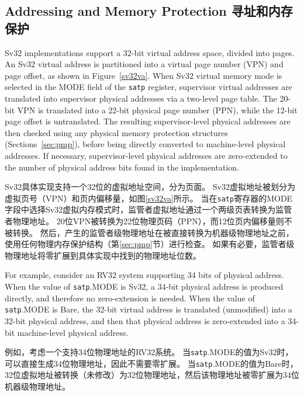 \subsection{Addressing and Memory Protection 寻址和内存保护}
\label{sec:translation}

Sv32 implementations support a 32-bit virtual address space, divided
into  pages.  An Sv32 virtual address is partitioned
into a virtual page number (VPN) and page offset, as shown in
Figure~\ref{sv32va}.  When Sv32 virtual memory mode is selected in the
MODE field of the {\tt satp} register, supervisor virtual addresses
are translated into supervisor physical addresses via a two-level page
table.  The 20-bit VPN is translated into a 22-bit physical page
number (PPN), while the 12-bit page offset is untranslated.  The
resulting supervisor-level physical addresses are then checked using
any physical memory protection structures (Sections~\ref{sec:pmp}),
before being directly converted to machine-level physical addresses.
If necessary, supervisor-level physical addresses are zero-extended
to the number of physical address bits found in the implementation.


Sv32具体实现支持一个32位的虚拟地址空间，分为页面。
Sv32虚拟地址被划分为虚拟页号（VPN）和页内偏移量，如图\ref{sv32va}所示。
当在{\tt satp}寄存器的MODE字段中选择Sv32虚拟内存模式时，监管者虚拟地址通过一个两级页表转换为监管者物理地址。
20位VPN被转换为22位物理页码（PPN），而12位页内偏移量则不被转换。
然后，产生的监管者级物理地址在被直接转换为机器级物理地址之前，使用任何物理内存保护结构（第\ref{sec:pmp}节）进行检查。
如果有必要，监管者级物理地址将零扩展到具体实现中找到的物理地址位数。

\begin{commentary}

For example, consider an RV32 system supporting 34 bits of physical
address.  When the value of {\tt satp}.MODE is Sv32, a 34-bit physical
address is produced directly, and therefore no zero-extension is needed.
When the value of {\tt satp}.MODE is Bare, the 32-bit virtual address is
translated (unmodified) into a 32-bit physical address, and then that
physical address is zero-extended into a 34-bit machine-level physical
address.

例如，考虑一个支持34位物理地址的RV32系统。
当{\tt satp}.MODE的值为Sv32时，可以直接生成34位物理地址，因此不需要零扩展。
当{\tt satp}.MODE的值为Bare时，32位虚拟地址被转换（未修改）为32位物理地址，然后该物理地址被零扩展为34位机器级物理地址。
\end{commentary}

